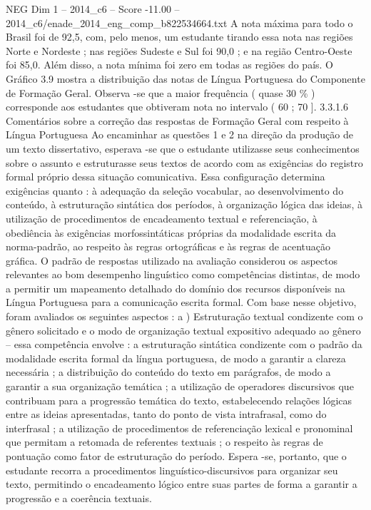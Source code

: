 \begin{textsample}{NEG Dim 1 – 2014\_c6 – Score -11.00 – 2014\_c6/enade\_2014\_eng\_comp\_b822534664.txt}
A nota máxima para todo o Brasil foi de 92,5, com, pelo menos, um estudante tirando essa nota nas regiões Norte e Nordeste ; nas regiões Sudeste e Sul foi 90,0 ; e na região Centro-Oeste foi 85,0.
Além disso, a nota mínima foi zero em todas as regiões do país.
O Gráfico 3.9 mostra a distribuição das notas de Língua Portuguesa do Componente de Formação Geral.
Observa -se que a maior frequência ( quase 30 \% ) corresponde aos estudantes que obtiveram nota no intervalo ( 60 ; 70 ]. 3.3.1.6 Comentários sobre a correção das respostas de Formação Geral com respeito à Língua Portuguesa Ao encaminhar as questões 1 e 2 na direção da produção de um texto dissertativo, esperava -se que o estudante utilizasse seus conhecimentos sobre o assunto e estruturasse seus textos de acordo com as exigências do registro formal próprio dessa situação comunicativa.
Essa configuração determina exigências quanto : à adequação da seleção vocabular, ao desenvolvimento do conteúdo, à estruturação sintática dos períodos, à organização lógica das ideias, à utilização de procedimentos de encadeamento textual e referenciação, à obediência às exigências morfossintáticas próprias da modalidade escrita da norma-padrão, ao respeito às regras ortográficas e às regras de acentuação gráfica.
O padrão de respostas utilizado na avaliação considerou os aspectos relevantes ao bom desempenho linguístico como competências distintas, de modo a permitir um mapeamento detalhado do domínio dos recursos disponíveis na Língua Portuguesa para a comunicação escrita formal.
Com base nesse objetivo, foram avaliados os seguintes aspectos : a ) Estruturação textual condizente com o gênero solicitado e o modo de organização textual expositivo adequado ao gênero – essa competência envolve : a estruturação sintática condizente com o padrão da modalidade escrita formal da língua portuguesa, de modo a garantir a clareza necessária ; a distribuição do conteúdo do texto em parágrafos, de modo a garantir a sua organização temática ; a utilização de operadores discursivos que contribuam para a progressão temática do texto, estabelecendo relações lógicas entre as ideias apresentadas, tanto do ponto de vista intrafrasal, como do interfrasal ; a utilização de procedimentos de referenciação lexical e pronominal que permitam a retomada de referentes textuais ; o respeito às regras de pontuação como fator de estruturação do período.
Espera -se, portanto, que o estudante recorra a procedimentos linguístico-discursivos para organizar seu texto, permitindo o encadeamento lógico entre suas partes de forma a garantir a progressão e a coerência textuais.

\end{textsample}
